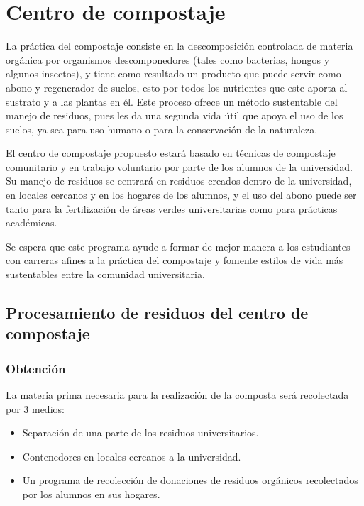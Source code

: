 \chapter{Centro de compostaje}

La práctica del compostaje consiste en la descomposición controlada de materia orgánica por organismos descomponedores (tales como bacterias, hongos y algunos insectos), y tiene como resultado un producto que puede servir como abono y regenerador de suelos, esto por todos los nutrientes que este aporta al sustrato y a las plantas en él. Este proceso ofrece un método sustentable del manejo de residuos, pues les da una segunda vida útil que apoya el uso de los suelos, ya sea para uso humano o para la conservación de la naturaleza.

El centro de compostaje propuesto estará basado en técnicas de compostaje comunitario y en trabajo voluntario por parte de los alumnos de la universidad. Su manejo de residuos se centrará en residuos creados dentro de la universidad, en locales cercanos y en los hogares de los alumnos, y el uso del abono puede ser tanto para la fertilización de áreas verdes universitarias como para prácticas académicas.

Se espera que este programa ayude a formar de mejor manera a los estudiantes con carreras afines a la práctica del compostaje y fomente estilos de vida más sustentables entre la comunidad universitaria.


\section{Procesamiento de residuos del centro de compostaje}

\subsection{Obtención}

La materia prima necesaria para la realización de la composta será recolectada por 3 medios:

\begin{itemize}
    \item Separación de una parte de los residuos universitarios.
    \item Contenedores en locales cercanos a la universidad.
    \item Un programa de recolección de donaciones de residuos orgánicos recolectados por los alumnos en sus hogares.
\end{itemize}

